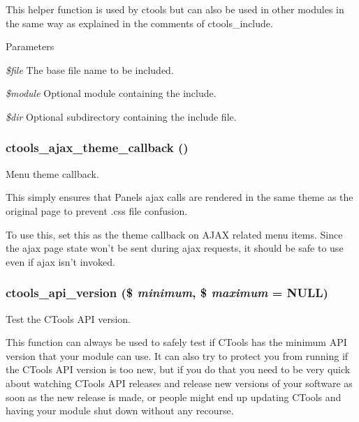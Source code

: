 This helper function is used by ctools but can also be used in other modules in the same way as explained in the comments of ctools\_\-include.


\begin{DoxyParams}{Parameters}
\item[{\em \$file}]The base file name to be included. \item[{\em \$module}]Optional module containing the include. \item[{\em \$dir}]Optional subdirectory containing the include file. \end{DoxyParams}
\hypertarget{ctools_8module_a270062e67835dc99cc4b57fba5f06289}{
\subsubsection[{ctools\_\-ajax\_\-theme\_\-callback}]{\setlength{\rightskip}{0pt plus 5cm}ctools\_\-ajax\_\-theme\_\-callback ()}}
\label{ctools_8module_a270062e67835dc99cc4b57fba5f06289}
Menu theme callback.

This simply ensures that Panels ajax calls are rendered in the same theme as the original page to prevent .css file confusion.

To use this, set this as the theme callback on AJAX related menu items. Since the ajax page state won't be sent during ajax requests, it should be safe to use even if ajax isn't invoked. \hypertarget{ctools_8module_a68cd3b30d58f60bb475e83662282536c}{
\subsubsection[{ctools\_\-api\_\-version}]{\setlength{\rightskip}{0pt plus 5cm}ctools\_\-api\_\-version (\$ {\em minimum}, \/  \$ {\em maximum} = {\ttfamily NULL})}}
\label{ctools_8module_a68cd3b30d58f60bb475e83662282536c}
Test the CTools API version.

This function can always be used to safely test if CTools has the minimum API version that your module can use. It can also try to protect you from running if the CTools API version is too new, but if you do that you need to be very quick about watching CTools API releases and release new versions of your software as soon as the new release is made, or people might end up updating CTools and having your module shut down without any recourse.

